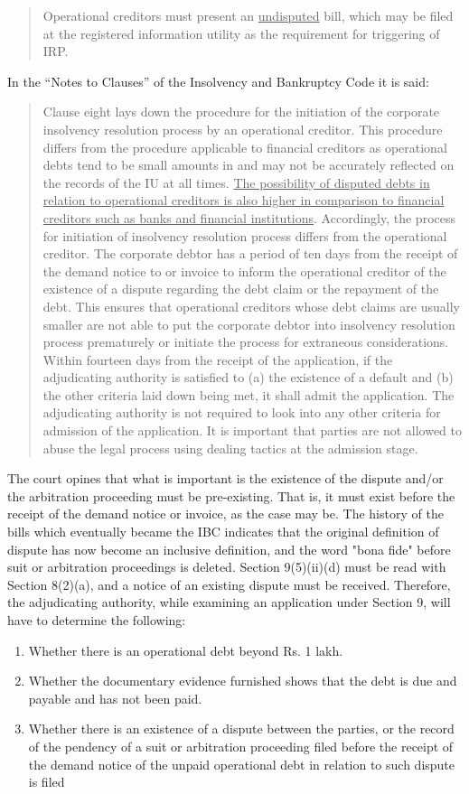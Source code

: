 \documentclass[12pt]{article}
\begin{document}
\begin{quote}
Operational creditors must present an \uline{undisputed} bill, which may be filed at the registered information utility as the requirement for triggering of IRP.
\end{quote}
\noindent In the ``Notes to Clauses'' of the Insolvency and Bankruptcy Code it is said:
\begin{quote}
Clause eight lays down the procedure for the initiation of the corporate insolvency resolution process by an operational creditor. This procedure differs from the procedure applicable to financial creditors as operational debts tend to be small amounts in and may not be accurately reflected on the records of the IU at all times. \uline{The possibility of disputed debts in relation to operational creditors is also higher in comparison to financial creditors such as banks and financial institutions}. Accordingly, the process for initiation of insolvency resolution process differs from the operational creditor. The corporate debtor has a period of ten days from the receipt of the demand notice to or invoice to inform the operational creditor of the existence of a dispute regarding the debt claim or the repayment of the debt. This ensures that operational creditors whose debt claims are usually smaller are not able to put the corporate debtor into insolvency resolution process prematurely or initiate the process for extraneous considerations. Within fourteen days from the receipt of the application, if the adjudicating authority is satisfied to (a) the existence of a default and (b) the other criteria laid down being met, it shall admit the application. The adjudicating authority is not required to look into any other criteria for admission of the application. It is important that parties are not allowed to abuse the legal process using dealing tactics at the admission stage.
\end{quote}

\noindent The court opines that what is important is the existence of the dispute and/or the arbitration proceeding must be pre-existing. That is, it must exist before the receipt of the demand notice or invoice, as the case may be. The history of the bills which eventually became the IBC indicates that the original definition of dispute has now become an inclusive definition, and the word "bona fide" before suit or arbitration proceedings is deleted. Section 9(5)(ii)(d) must be read with Section 8(2)(a), and a notice of an existing dispute must be received. Therefore, the adjudicating authority, while examining an application under Section 9, will have to determine the following:
\begin{enumerate}
\item Whether there is an operational debt beyond Rs. 1 lakh.
\item Whether the documentary evidence furnished shows that the debt is due and payable and has not been paid.
\item Whether there is an existence of a dispute between the parties, or the record of the pendency of a suit or arbitration proceeding filed before the receipt of the demand notice of the unpaid operational debt in relation to such dispute is filed
\end{enumerate}
\end{document}
